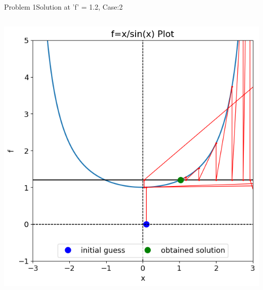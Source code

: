 \documentclass{beamer}
\begin{document}
\begin{frame}{Problem 1}{Solution at 'f' = 1.2, Case:2}
\begin{columns}
\begin{block}{}
            \includegraphics[width=\textwidth]{Figures/prob1_sol22.png}
        \end{block}
    \end{columns}
\end{frame}
\end{document}
